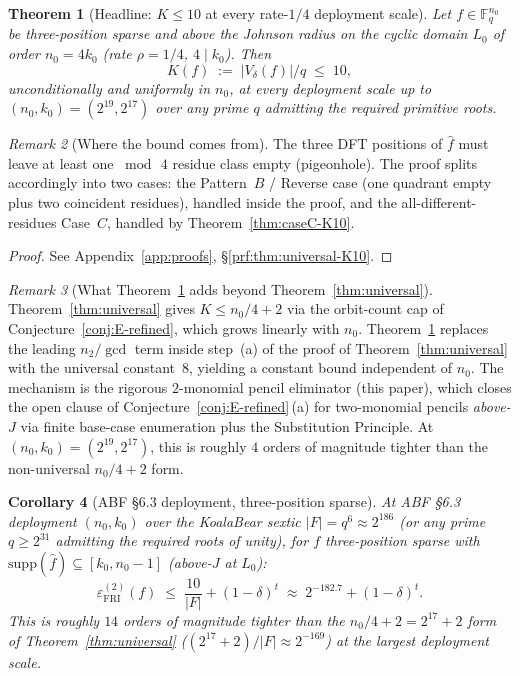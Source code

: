 \documentclass[11pt]{article}
\newtheorem{theorem}{Theorem}[section]
\newtheorem{corollary}[theorem]{Corollary}
\theoremstyle{definition}
\theoremstyle{remark}
\newtheorem{remark}[theorem]{Remark}
\newcommand{\FF}{\mathbb{F}}
\begin{document}
\begin{theorem}[Headline: $K \leq 10$ at every rate-$1/4$ deployment scale]
\label{thm:universal-K10}
Let $f \in \FF_q^{n_0}$ be three-position sparse and above the
Johnson radius on the cyclic domain $L_0$ of order $n_0 = 4 k_0$
(rate $\rho = 1/4$, $4 \mid k_0$). Then
\[
 K(f) \;:=\; |V_\delta(f)| / q \;\leq\; 10,
\]
unconditionally and uniformly in $n_0$, at every deployment scale up
to $(n_0, k_0) = (2^{19}, 2^{17})$ over any prime $q$ admitting the
required primitive roots.
\end{theorem}

\begin{remark}[Where the bound comes from]
The three DFT positions of $\hat f$ must leave at least one $\bmod\,4$
residue class empty (pigeonhole). The proof splits accordingly into
two cases: the Pattern~$B$ / Reverse case (one quadrant empty plus
two coincident residues), handled inside the proof, and the
all-different-residues Case~$C$, handled by
Theorem~\ref{thm:caseC-K10}.
\end{remark}

\begin{proof}[Proof] See Appendix~\ref{app:proofs}, \S\ref{prf:thm:universal-K10}.\end{proof}

\begin{remark}[What Theorem~\ref{thm:universal-K10} adds beyond
Theorem~\ref{thm:universal}]
\label{rem:K10-vs-n0over4}
Theorem~\ref{thm:universal} gives $K \leq n_0/4 + 2$ via the orbit-count
cap of Conjecture~\ref{conj:E-refined}, which grows linearly with
$n_0$. Theorem~\ref{thm:universal-K10} replaces the leading
$n_2/\gcd$ term inside step~(a) of the proof of
Theorem~\ref{thm:universal} with the universal constant~$8$, yielding
a constant bound independent of $n_0$. The mechanism is
the rigorous $2$-monomial pencil eliminator
(this paper), which closes the open clause of
Conjecture~\ref{conj:E-refined}\,(a) for two-monomial pencils
\emph{above-$J$} via finite base-case enumeration plus the
Substitution Principle. At $(n_0, k_0) = (2^{19}, 2^{17})$, this
is roughly $4$ orders of magnitude tighter than the non-universal
$n_0/4 + 2$ form.
\end{remark}

\begin{corollary}[ABF \S 6.3 deployment, three-position sparse]
\label{cor:abf-K10}
At ABF \S 6.3 deployment $(n_0, k_0)$ over the KoalaBear sextic
$|F| = q^6 \approx 2^{186}$ (or any prime $q \geq 2^{31}$ admitting
the required roots of unity), for $f$ three-position sparse with
$\mathrm{supp}(\hat f) \subseteq [k_0, n_0 - 1]$ (above-$J$ at $L_0$):
\[
 \varepsilon_{\mathrm{FRI}}^{(2)}(f) \;\leq\; \frac{10}{|F|} + (1-\delta)^t
 \;\approx\; 2^{-182.7} + (1-\delta)^t.
\]
This is roughly $14$ orders of magnitude tighter than the
$n_0/4 + 2 = 2^{17} + 2$ form of Theorem~\ref{thm:universal}
($(2^{17} + 2)/|F| \approx 2^{-169}$) at the largest deployment scale.
\end{corollary}
\end{document}
